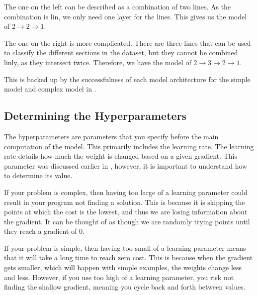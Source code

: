 The one on the left can be described as a combination of two lines. As the combination is \gls{lin}, we only need one \gls{layer} for the lines. This gives us the \gls{model} of $2\rightarrow2\rightarrow1$.

The one on the right is more complicated. There are three lines that can be used to classify the different sections in the dataset, but they cannot be combined \gls{lin}ly, as they intersect twice. Therefore, we have the \gls{model} of $2\rightarrow3\rightarrow2\rightarrow1$.

This is backed up by the successfulness of each model architecture for the simple model and complex model in .

\subsection{Determining the Hyperparameters}

The hyperparameters are parameters that you specify before the main computation of the model. This primarily includes the learning rate. The learning rate details how much the weight is changed based on a given gradient. This parameter was discussed earlier in , however, it is important to understand how to determine its value.

If your problem is complex, then having too large of a learning parameter could result in your program not finding a solution. This is because it is skipping the points at which the cost is the lowest, and thus we are losing information about the gradient. It can be thought of as though we are randomly trying points until they reach a gradient of 0.

If your problem is simple, then having too small of a learning parameter means that it will take a long time to reach zero cost. This is because when the gradient gets smaller, which will happen with simple examples, the weights change less and less. However, if you use too high of a learning parameter, you risk not finding the shallow gradient, meaning you cycle back and forth between values.
